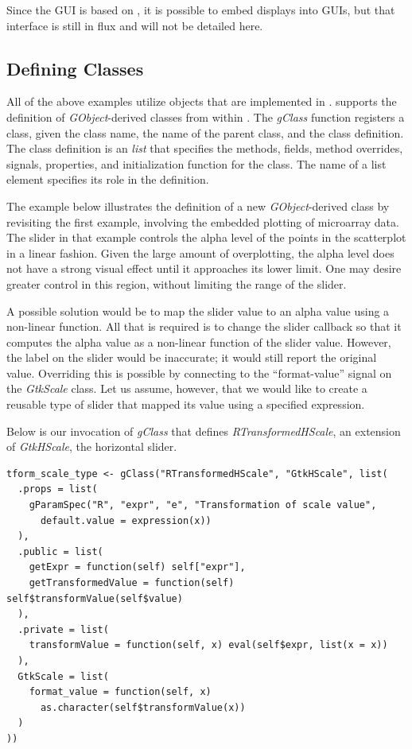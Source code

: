\documentclass[article]{jss}
\begin{document}
Since the  GUI is based on , it is possible to embed 
 displays into  GUIs, but that interface is still in flux
and will not be detailed here.

\subsection[Defining GObject Classes]{Defining  Classes}

All of the above examples utilize objects that are implemented in .
 supports the definition of \emph{GObject}-derived classes from within
.  The \emph{gClass} function registers a 
class, given the class name, the name of the parent class, and the class 
definition. The class definition is an  \emph{list} that specifies the
methods, fields, method overrides, signals, properties, and
initialization function for the class. The name of a list element specifies
its role in the definition. 

The example below illustrates the definition of a new \emph{GObject}-derived
class by revisiting the first example, involving the embedded plotting of 
microarray data. The slider in that example controls the alpha level of the
points in the scatterplot in a linear fashion. Given the large amount of
overplotting, the alpha level does not have a strong visual effect until it
approaches its lower limit. One may desire greater control in this region,
without limiting the range of the slider. 

A possible solution would be to map the slider value to an alpha value using a 
non-linear function. All that is
required is to change the slider callback so that it computes the
alpha value as a non-linear function of the slider value. However, the 
label on the slider would be inaccurate; it would still report the original value.
Overriding this is possible by connecting to the ``format-value'' signal on
the \emph{GtkScale} class. Let us assume, however, that we would like to create
a reusable type of slider that mapped its value using a specified  expression.

Below is our invocation of \emph{gClass} that
defines \emph{RTransformedHScale}, an extension of \emph{GtkHScale}, the horizontal slider.
\begin{verbatim}
tform_scale_type <- gClass("RTransformedHScale", "GtkHScale", list(
  .props = list(
    gParamSpec("R", "expr", "e", "Transformation of scale value",
      default.value = expression(x))
  ),
  .public = list(
    getExpr = function(self) self["expr"],
    getTransformedValue = function(self) self$transformValue(self$value)
  ),
  .private = list(
    transformValue = function(self, x) eval(self$expr, list(x = x))
  ),
  GtkScale = list(
    format_value = function(self, x)
      as.character(self$transformValue(x))
  )
))
\end{verbatim}
\end{document}
